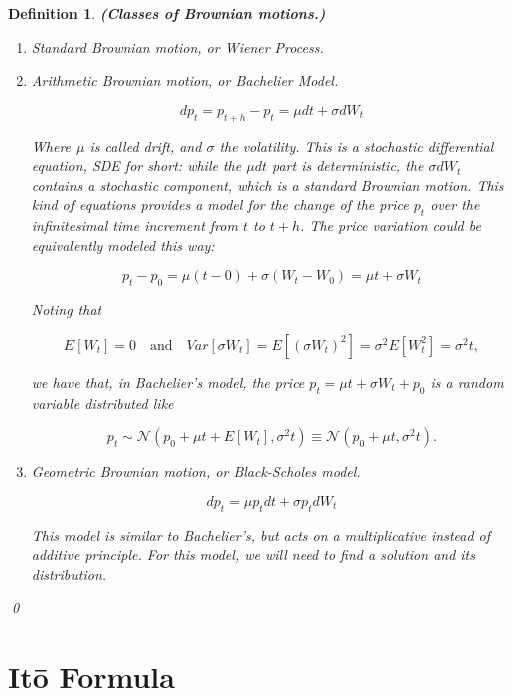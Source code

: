 \documentclass[oneside,titlepage,headinclude,12pt,a4paper,BCOR5mm,footinclude]{book}
\theoremstyle{defn}
\newtheorem{defn}{Definition}
\begin{document}
\begin{defn}\textbf{(Classes of Brownian motions.)}

\begin{enumerate}[label=(\Roman*)]
  \item \textit{Standard Brownian motion}, or \textit{Wiener Process}.
  \item \textit{Arithmetic Brownian motion}, or \textit{Bachelier Model}.
    
    \[
      dp_t = p_{t+h} - p_t = \mu dt + \sigma dW_t
    \]

    Where    $\mu$    is    called   \textit{drift},    and    $\sigma$    the
    \textit{volatility}. This is  a \textit{stochastic differential equation},
    \textit{SDE} for short: while the $\mu dt$ part is \textit{deterministic},
    the $\sigma  dW_t$ contains  a \textit{stochastic}  component, which  is a
    standard Brownian motion. This kind of  equations provides a model for the
    change of the  price $p_t$ over the infinitesimal time  increment from $t$
    to $t+h$. The price variation could be equivalently modeled this way:

    \[
      p_t - p_0 = \mu(t-0) + \sigma(W_t - W_0) = \mu t + \sigma W_t
    \]
    
    Noting that 

    \[ 
      E[W_t]  =  0
      \quad \text{and} \quad
      Var[\sigma W_t]  =  E[(\sigma W_t)^2]  = \sigma^2 E[W_t^2] =  \sigma^2 t,
    \]

    we have that, in Bachelier's model, the price  $p_t = \mu t + \sigma W_t +
    p_0$ is a \textit{random variable} distributed like

    \[
      p_t \sim \mathcal{N}(p_0 + \mu t + E[W_t], \sigma^2 t) \equiv
        \mathcal{N}(p_0 + \mu t, \sigma^2 t).
    \]

  \item \textit{Geometric Brownian motion}, or \textit{Black-Scholes model}.

    \[
      dp_t = \mu p_t dt + \sigma p_t dW_t
    \]

    This model is similar to Bachelier's, but acts on a multiplicative instead
    of additive principle. For this model, we will need to find a solution and
    its distribution.

\end{enumerate}
\qed
\end{defn}

\section{It\=o Formula}
\end{document}
